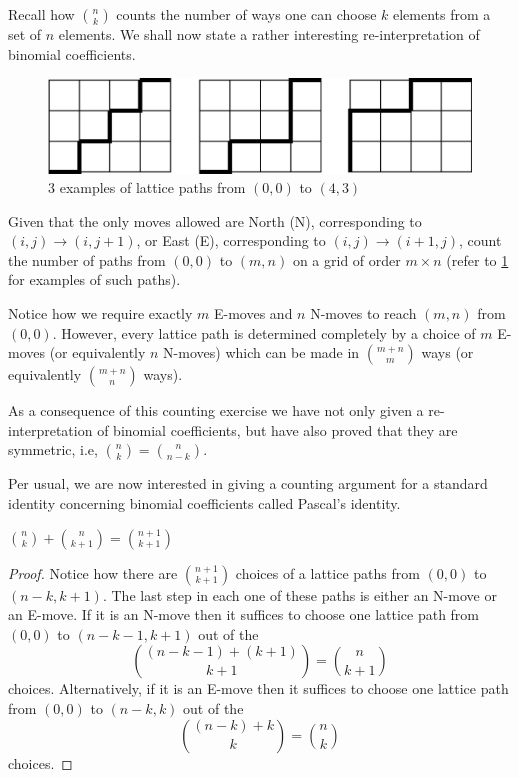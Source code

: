 Recall how $\binom{n}{k}$ counts the number of ways one can choose $k$ elements from a set of $n$ elements. We shall now state a rather interesting re-interpretation of binomial coefficients. 
\begin{figure}[H]
	\centering
	\includegraphics[scale=0.6]{Images/Figure8.png}
	\caption{$3$ examples of lattice paths from $\left( 0,0 \right)$ to $\left( 4,3 \right) $}
	\label{f:1.8}
\end{figure}
\begin{question}
Given that the only moves allowed are North (N), corresponding to $\left( i,j \right) \to \left( i,j+1 \right)$, or East (E), corresponding to $\left( i,j \right)\to \left( i+1,j \right)$, count the number of paths from $\left( 0,0 \right)$ to $\left( m,n \right)$ on a grid of order $m\times n$ (refer to \cref{f:1.8} for examples of such paths).
\label{q:1.8}
\end{question}
\begin{solution}
Notice how we require exactly $m$ E-moves and $n$ N-moves to reach $\left( m,n \right)$ from $\left( 0,0 \right)$. However, every lattice path is determined completely by a choice of $m$ E-moves (or equivalently $n$ N-moves) which can be made in $\binom{m+n}{m}$ ways (or equivalently $\binom{m+n}{n}$ ways).
\end{solution}
\begin{remark}
As a consequence of this counting exercise we have not only given a re-interpretation of binomial coefficients, but have also proved that they are symmetric, i.e, $\binom{n}{k}=\binom{n}{n-k}$.
\label{r:1.2}
\end{remark}
Per usual, we are now interested in giving a counting argument for a standard identity concerning binomial coefficients called Pascal's identity.
\begin{claim}
$\binom{n}{k} + \binom{n}{k+1} = \binom{n+1}{k+1}$
\label{c:1.3}
\end{claim}
\begin{proof}
Notice how there are $\binom{n+1}{k+1}$ choices of a lattice paths from $\left( 0,0 \right)$ to $\left( n-k,k+1 \right)$. The last step in each one of these paths is either an N-move or an E-move. If it is an N-move then it suffices to choose one lattice path from $\left( 0,0 \right)$ to $\left( n-k-1,k+1 \right)$ out of the \[
\binom{\left( n-k-1 \right) + \left( k+1 \right)}{k+1} = \binom{n}{k+1}
\] choices. Alternatively, if it is an E-move then it suffices to choose one lattice path from $\left( 0,0 \right)$ to $\left( n-k,k \right)$ out of the \[
\binom{\left( n-k \right) + k}{k} = \binom{n}{k}\] choices.
\end{proof}
